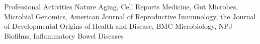 \begin{rubric}{Professional Activities}
%
	Nature Aging, Cell Reports Medicine, Gut Microbes, Microbial Genomics, American Journal of Reproductive Immunology, the Journal of Developmental Origins of Health and Disease, BMC Microbiology,  NPJ Biofilms,  Inflammatory Bowel Diseases
\end{rubric}

